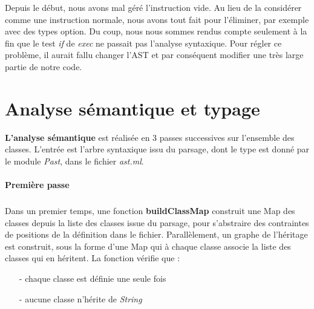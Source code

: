 \documentclass{article}
\begin{document}
Depuis le début, nous avons mal géré l'instruction vide. Au lieu de la
considérer comme une instruction normale, nous avons tout fait pour
l'éliminer, par exemple avec des types option. Du coup, nous nous sommes
rendus compte seulement à la fin que le test \emph{if} de \emph{exec} ne
passait pas l'analyse syntaxique. Pour régler ce problème, il aurait fallu
changer l'AST et par conséquent modifier une très large partie de notre code.

\section{Analyse sémantique et typage}

\textbf{L'analyse sémantique} est réalisée en 3 passes successives sur l'ensemble des classes. L'entrée est l'arbre syntaxique issu du parsage, dont le type est donné par le module \emph{Past}, dans le fichier \emph{ast.ml}.

\paragraph{Première passe}
\subparagraph*{}
 Dans un premier temps, une fonction \textbf{buildClassMap} construit une Map des classes depuis la liste des classes issue du parsage, pour s'abstraire des contraintes de positions de la définition dans le fichier. Parallèlement, un graphe de l'héritage est construit, sous la forme d'une Map qui à chaque classe associe la liste des classes qui en héritent. La fonction vérifie que :
 \begin{itemize} 
   \item[-] chaque classe est définie une seule fois
   \item[-] aucune classe n'hérite de \emph{String}
\end{itemize}
\end{document}

